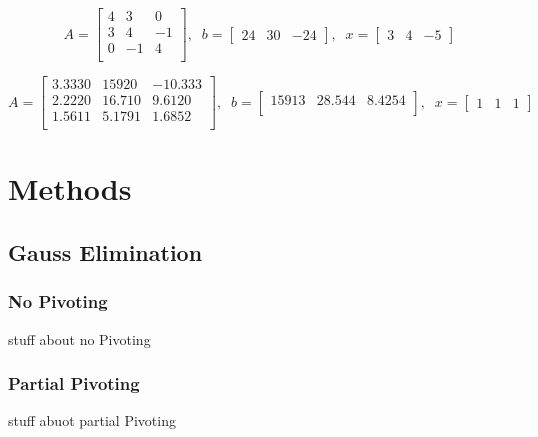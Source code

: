 \documentclass[11pt]{article}	%
\begin{document}
\begin{equation}\label{eq:sample3}
    A = \begin{bmatrix}
            4 & 3 & 0 \\
            3 & 4 & -1 \\
            0 & -1 & 4 \\
        \end{bmatrix}
    ,\;\;
    b = \begin{bmatrix}
            24 & 30 & -24
        \end{bmatrix}
    ,\;\;
    x = \begin{bmatrix}
            3 & 4 & -5
        \end{bmatrix}
\end{equation}

\begin{equation}\label{eq:sample4}
    A = \begin{bmatrix}
            3.3330 & 15920 & -10.333\\
            2.2220 & 16.710 & 9.6120\\
            1.5611 & 5.1791 & 1.6852\\
        \end{bmatrix}
    ,\;\;
    b = \begin{bmatrix}
            15913 & 28.544 & 8.4254\\
        \end{bmatrix}
    ,\;\;
    x = \begin{bmatrix}
            1 & 1 & 1
        \end{bmatrix}
\end{equation}

\section{Methods}

\subsection{Gauss Elimination}

    \subsubsection{No Pivoting}
    stuff about no Pivoting

    \subsubsection{Partial Pivoting}
    stuff abuot partial Pivoting
\end{document}
